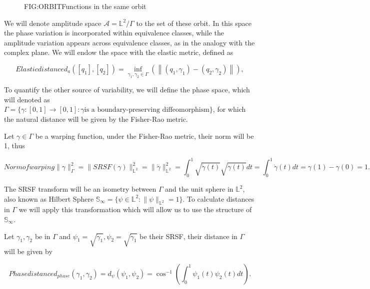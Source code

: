 \begin{figure}[Functions in the same orbit]{FIG:ORBIT}{Functions in the same orbit}
   \quad
\end{figure}

We will denote amplitude space $\mathscr{A}= \mathbb{L}^{2} / \Gamma$  to the
set of these orbit. In this space the phase variation is incorporated within
equivalence classes, while the amplitude variation appears across equivalence
classes, as in the analogy with the complex plane. We will endow the space with
the elastic metric, defined as

\begin{equation}[EQ:ELASTIC]{Elastic distance}
d_{a}\left(\left[q_{1}\right],\left[q_{2}\right]\right)=\inf _{
\gamma_{1}, \gamma_{2} \in {\Gamma}}\left(\left\|\left(q_{1},
 \gamma_{1}\right)-\left(q_{2}, \gamma_{2}\right)\right\|\right),
\end{equation}

To quantify the other source of variability, we will define the phase space,
which will denoted as
$\Gamma = \{\gamma :[0,1] \rightarrow[0,1]  : \gamma \text{is a boundary-preserving diffeomorphism}\}$,
for which the natural distance will be given by the Fisher-Rao metric.

Let $\gamma \in \Gamma$ be a warping function, under the Fisher-Rao metric,
their norm will be 1, thus

\begin{equation}[]{Norm of warping}
\| \gamma \|_\Gamma^2 = \| SRSF(\gamma)\|_{\mathbb{L}^2}^2 =  \| \dot \gamma\|_{\mathbb{L}^2}^2 =
\int_0^1 \sqrt{\dot \gamma (t)} \sqrt{\dot \gamma (t)}dt =
\int_0^1 \dot \gamma(t)dt = \gamma(1) - \gamma(0) = 1.
\end{equation}

The SRSF transform will be an isometry between $\Gamma$ and the unit sphere in
$\mathbb{L}^2$, also known as Hilbert Sphere
$\mathbb{S}_\infty = \{ \psi \in \mathbb{L}^2 : \|\psi\|_{\mathbb{L}^2}=1\}$.
To calculate distances in $\Gamma$ we will apply this transformation which will
allow us to use the structure of $\mathbb{S}_\infty$.

Let $\gamma_1, \gamma_2$ be in $\Gamma$ and $\psi_1=\sqrt{\dot \gamma_1},
\psi_2=\sqrt{\dot \gamma_1}$ be their SRSF, their distance in $\Gamma$ will be
given by

\begin{equation}[]{Phase distance}
d_{phase}(\gamma_1, \gamma_2) = d_{\psi}(\psi_1, \psi_2) =
\cos^{-1}\left (\int_0^1 \psi_1(t) \psi_2(t) dt\right ).
\end{equation}

